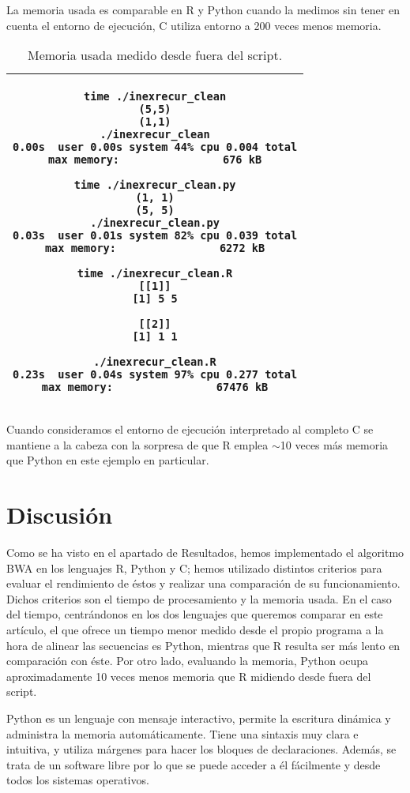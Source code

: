 \documentclass{article}
\newcommand{\tempcaption}{}
\newenvironment{codesnip}[1]{
\begin{table}[h!]
\gdef\tempcaption{#1}
\centering
\begin{tabular}{|c|}
\hline}
{\\\hline
\end{tabular}
\caption{\tempcaption}
\end{table}}
\newcommand{\C}{C }
\newcommand{\R}{R }
\newcommand{\python}{Python }
\begin{document}
La memoria usada es comparable en \R y \python cuando la medimos sin
tener en cuenta el entorno de ejecución, \C{} utiliza entorno a 200
veces menos memoria.

\vfill
\begin{codesnip}{Memoria usada medido desde fuera del script.}
\begin{lstlisting}
time ./inexrecur_clean
(5,5)
(1,1)
./inexrecur_clean
0.00s  user 0.00s system 44% cpu 0.004 total
max memory:                676 kB

time ./inexrecur_clean.py
(1, 1)
(5, 5)
./inexrecur_clean.py
0.03s  user 0.01s system 82% cpu 0.039 total
max memory:                6272 kB

time ./inexrecur_clean.R
[[1]]
[1] 5 5

[[2]]
[1] 1 1

./inexrecur_clean.R
0.23s  user 0.04s system 97% cpu 0.277 total
max memory:                67476 kB
\end{lstlisting}
\end{codesnip}

Cuando consideramos el entorno de ejecución interpretado al completo C
se mantiene a la cabeza con la sorpresa de que R emplea $\sim$10 veces
más memoria que \python en este ejemplo en particular.

\section{Discusión}
\vspace{-0.25cm}

Como se ha visto en el apartado de Resultados, hemos  implementado  el
algoritmo BWA  en  los	lenguajes  R,  Python  y  C;  hemos  utilizado
distintos criterios para evaluar el rendimiento de  éstos  y  realizar
una comparación de su funcionamiento.  Dichos criterios son el	tiempo
de  procesamiento  y  la  memoria  usada.   En	el  caso  del  tiempo,
centrándonos en los  dos  lenguajes  que  queremos  comparar  en  este
artículo, el que  ofrece  un  tiempo  menor  medido  desde  el	propio
programa a la hora de alinear las secuencias es Python, mientras que R
resulta ser más  lento	en  comparación  con  éste.   Por  otro  lado,
evaluando la memoria, Python  ocupa  aproximadamente  10  veces  menos
memoria que R midiendo desde fuera del script.

Python es un lenguaje con mensaje interactivo,	permite  la  escritura
dinámica y administra la memoria automáticamente.  Tiene una  sintaxis
muy clara e intuitiva, y utiliza márgenes para hacer  los  bloques  de
declaraciones.	Además, se trata de un software libre por  lo  que  se
puede acceder a él fácilmente y desde todos los  sistemas  operativos.
\cite{fangohr_2004}
\end{document}
